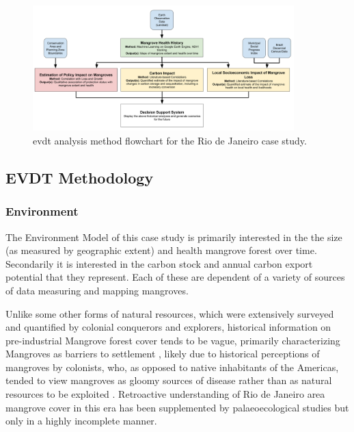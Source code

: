 \begin{figure}[!htb]
\centering
\includegraphics[width=0.9\textwidth]{Figures/chap4/evdt-dss-flow.png}
\caption[EVDT Analysis Method Flowchart]{\ac{evdt} analysis method flowchart for the Rio de Janeiro case study.}
\label{fig:evdt-dss-flow}
\end{figure}



\subsection{EVDT Methodology} \label{sec:rio-evdt-method}

\subsubsection{Environment} \label{sec:rio-evdt-e-method}

The Environment Model of this case study is primarily interested in the the size (as measured by geographic extent) and health mangrove forest over time. Secondarily it is interested in the carbon stock and annual carbon export potential that they represent. Each of these are dependent of a variety of sources of data measuring and mapping mangroves.

Unlike some other forms of natural resources, which were extensively surveyed and quantified by colonial conquerors and explorers, historical information on pre-industrial Mangrove forest cover tends to be vague, primarily characterizing Mangroves as barriers to settlement \cite{amadorBaiaGuanabaraOcupacao2013}, likely due to historical perceptions of mangroves by colonists, who, as opposed to native inhabitants of the Americas, tended to view mangroves as gloomy sources of disease rather than as natural resources to be exploited \cite{friessEcosystemServicesDisservices2016}. Retroactive understanding of Rio de Janeiro area mangrove cover in this era has been supplemented by palaeoecological studies \cite{vilelaLateHoloceneEvolution2014} but only in a highly incomplete manner. 


